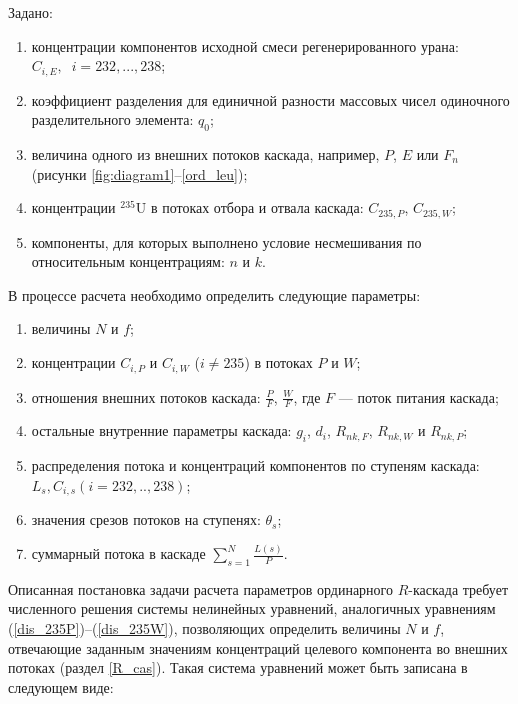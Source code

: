 Задано: 

\begin{enumerate}
  \item концентрации компонентов исходной смеси регенерированного урана: ${C}_{i,E}, \; \; i = 232,..., 238$;
  \item коэффициент разделения для единичной разности массовых чисел одиночного разделительного элемента: ${q}_{0}$;
  \item величина одного из внешних потоков каскада, например, $P$, $E$ или $F_n$ (рисунки \ref{fig:diagram1}--\ref{ord_leu});
  \item концентрации $^{235}$U в потоках отбора и отвала каскада: ${C_{235, P}}$, ${C_{235, W}}$;
  \item компоненты, для которых выполнено условие несмешивания по относительным концентрациям: $n$ и $k$.
\end{enumerate}

В процессе расчета необходимо определить следующие параметры: 

\begin{enumerate}
  \item величины $N$ и $f$;
  \item концентрации ${C}_{i,P}$ и ${C}_{i,W}$ ($i \neq 235$) в потоках $P$ и $W$; 
  \item отношения внешних потоков каскада: $\frac{P}{F}$, $\frac{W}{F}$, где $F$ --- поток питания каскада;
  \item остальные внутренние параметры каскада: $g_{i}$, $d_{i}$, $R_{n k,F}$, $R_{n k,W}$ и $R_{n k,P}$;
  \item распределения потока и концентраций компонентов по ступеням каскада: $L_{s}, C_{i,s} (i = 232,.., 238)$;
  \item значения срезов потоков на ступенях: $\theta_{s}$;
  \item суммарный потока в каскаде $\sum _{s=1}^{N}\frac{L(s)}{P}$.%
\end{enumerate}

Описанная постановка задачи расчета параметров ординарного $R$-каскада требует численного решения системы нелинейных уравнений, аналогичных уравнениям (\ref{dis_235P})--(\ref{dis_235W}), позволяющих определить величины $N$ и $f$, отвечающие заданным значениям концентраций целевого компонента во внешних потоках (раздел \ref{R_cas}). Такая система уравнений может быть записана в следующем виде: 

